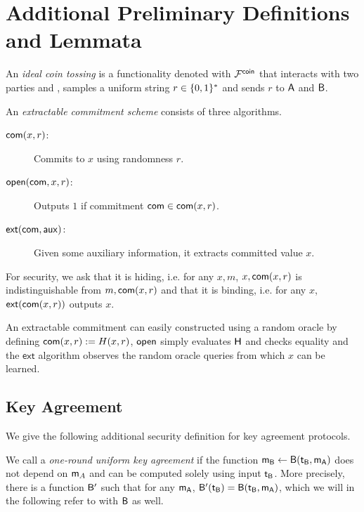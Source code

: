\section{Additional Preliminary Definitions and Lemmata}\label{sec:defsandlems}



\begin{definition}\label{def:coin}
An \emph{ideal coin tossing} is a functionality denoted with $\mathcal{F}^{\mathsf{coin}}$ that interacts with two parties \A and \B, samples a uniform string $r\in\{0,1\}^*$ and sends $r$ to $\mathsf{A}$ and $\mathsf{B}$.
\end{definition}

\newcommand{\extract}{\ensuremath{\mathsf{ext}}\xspace}

\begin{definition}\label{def:com}
An \emph{extractable commitment scheme} consists of three algorithms.
\begin{description}
\item[$\mathsf{com}(x,r)$:] Commits to $x$ using randomness $r$. 
\item[$\mathsf{open}(\mathsf{com},x,r)$:] Outputs $1$ if commitment $\mathsf{com}\in\mathsf{com}(x,r)$.
\item[$\extract(\com,\aux)$:] Given some auxiliary information, it extracts committed value $x$. 
\end{description}
For security, we ask that it is hiding, i.e. for any $x,m$, $x, \mathsf{com}(x,r)$ is indistinguishable from $m,\mathsf{com}(x,r)$ and that it is binding, i.e. for any $x$, $\extract(\com(x,r))$ outputs $x$.
\end{definition}

An extractable commitment can easily constructed using a random oracle by defining $\mathsf{com}(x,r):=H(x,r)$, $\mathsf{open}$ simply evaluates $\mathsf{H}$ and checks equality and the $\extract$ algorithm observes the random oracle queries from which $x$ can be learned.

\subsection{Key Agreement}\label{sec:addKA}
We give the following additional security definition for key agreement protocols.

\begin{definition}
We call a \UKA \emph{one-round uniform key agreement} if the function $\mathsf{m}_{\mathsf{B}}\leftarrow\mathsf{B}(\mathsf{t}_{\mathsf{B}},\mathsf{m}_\mathsf{A})$ does not depend on $\mathsf{m}_A$ and can be computed solely using input $\mathsf{t}_{\mathsf{B}}$. More precisely, there is a function $\mathsf{B}'$ such that for any $\mathsf{m}_{\mathsf{A}}$, $\mathsf{B}'(\mathsf{t}_{\mathsf{B}})=\mathsf{B}(\mathsf{t}_{\mathsf{B}},\mathsf{m}_{\mathsf{A}})$, which we will in the following refer to with $\mathsf{B}$ as well. 
\end{definition}

